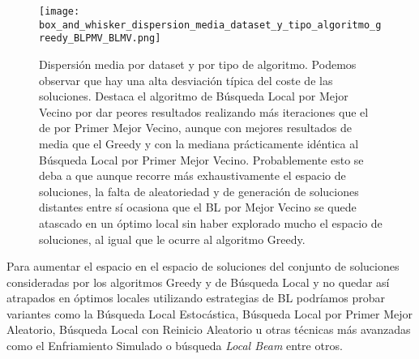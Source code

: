 \begin{figure}[ht]
    \centering
    \texttt{[image: box\_and\_whisker\_dispersion\_media\_dataset\_y\_tipo\_algoritmo\_greedy\_BLPMV\_BLMV.png]}
    \caption{Dispersión media por dataset y por tipo de algoritmo. Podemos observar que hay una alta desviación típica del coste de las soluciones.
    Destaca el algoritmo de Búsqueda Local por Mejor Vecino por dar peores resultados realizando más iteraciones que el de por Primer
    Mejor Vecino, aunque con mejores resultados de media que el Greedy y con la mediana prácticamente idéntica al Búsqueda Local por Primer Mejor Vecino.
    Probablemente esto se deba a que aunque recorre más exhaustivamente el espacio de soluciones, la falta de aleatoriedad y de generación
    de soluciones distantes entre sí ocasiona que el BL por Mejor Vecino se quede atascado en un óptimo local sin haber explorado mucho el espacio
    de soluciones, al igual que le ocurre al algoritmo Greedy.}
\end{figure}

Para aumentar el espacio en el espacio de soluciones del conjunto de soluciones consideradas por los algoritmos Greedy y de Búsqueda Local y no quedar
así atrapados en óptimos locales utilizando estrategias de BL podríamos probar variantes como la Búsqueda Local Estocástica, Búsqueda Local por Primer Mejor Aleatorio, Búsqueda Local
con Reinicio Aleatorio u otras técnicas más avanzadas como el Enfriamiento Simulado o búsqueda \textit{Local Beam} entre otros.\cite[Sección 4.1]{russell2020artificial}



